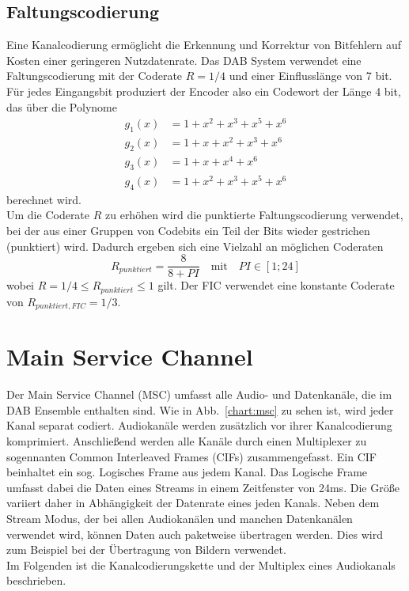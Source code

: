 \subsection{Faltungscodierung}
\label{sec:faltungscodierung}
Eine Kanalcodierung ermöglicht die Erkennung und Korrektur von Bitfehlern auf Kosten einer geringeren Nutzdatenrate. Das DAB System verwendet eine Faltungscodierung mit der Coderate $R=1/4$ und einer Einflusslänge von 7 bit. Für jedes Eingangsbit produziert der Encoder also ein Codewort der Länge 4 bit, das über die Polynome
\begin{equation}
\begin{aligned}
g_1(x) &= 1 + x^2 + x^3 + x^5 + x^6 \\
g_2(x) &= 1 + x + x^2 + x^3 + x^6 \\
g_3(x) &= 1 + x + x^4 + x^6 \\
g_4(x) &= 1 + x^2 + x^3 + x^5 + x^6
\end{aligned}
\end{equation}
berechnet wird. \\
Um die Coderate $R$ zu erhöhen wird die punktierte Faltungscodierung verwendet, bei der aus einer Gruppen von Codebits ein Teil der Bits wieder gestrichen (punktiert) wird. Dadurch ergeben sich eine Vielzahl an möglichen Coderaten
\begin{equation}
R_{punktiert} = \frac{8}{8 + PI} \quad \text{mit} \quad PI \in [1;24]
\end{equation}
wobei $R = 1/4 \leq R_{punktiert} \leq 1$ gilt. Der FIC verwendet eine konstante Coderate von $R_{punktiert, FIC} = 1/3$.

\section{Main Service Channel}
Der Main Service Channel (MSC) umfasst alle Audio- und Datenkanäle, die im DAB Ensemble enthalten sind. Wie in Abb.~\ref{chart:msc} zu sehen ist, wird jeder Kanal separat codiert. Audiokanäle werden zusätzlich vor ihrer Kanalcodierung komprimiert. Anschließend werden alle Kanäle durch einen Multiplexer zu sogennanten Common Interleaved Frames (CIFs) zusammengefasst. Ein CIF beinhaltet ein sog. Logisches Frame aus jedem Kanal. Das Logische Frame umfasst dabei die Daten eines Streams in einem Zeitfenster von 24ms. Die Größe variiert daher in Abhängigkeit der Datenrate eines jeden Kanals. Neben dem Stream Modus, der bei allen Audiokanälen und manchen Datenkanälen verwendet wird, können Daten auch paketweise übertragen werden. Dies wird zum Beispiel bei der Übertragung von Bildern verwendet.\\
Im Folgenden ist die Kanalcodierungskette und der Multiplex eines Audiokanals beschrieben.

